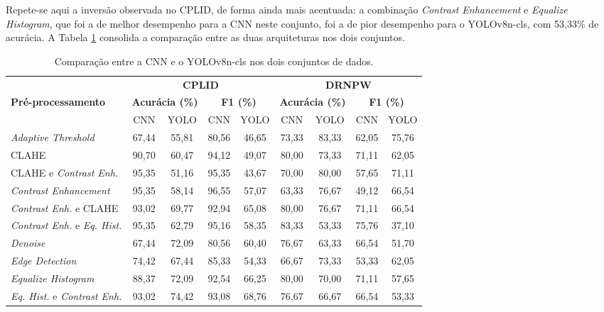 Repete-se aqui a inversão observada no CPLID, de forma ainda mais acentuada: a combinação \textit{Contrast Enhancement} e \textit{Equalize Histogram}, que foi a de melhor desempenho para a CNN neste conjunto, foi a de pior desempenho para o YOLOv8n-cls, com 53,33\% de acurácia. A Tabela \ref{tab:comparativo_arquiteturas} consolida a comparação entre as duas arquiteturas nos dois conjuntos.

\begin{table}[H]
    \centering
    \caption{\label{tab:comparativo_arquiteturas}Comparação entre a CNN e o YOLOv8n-cls nos dois conjuntos de dados.}
    \vspace{0.2cm}
    \footnotesize
    \setlength{\tabcolsep}{4pt}
    \begin{tabular}{lcccccccc}
        \hline
        & \multicolumn{4}{c}{\textbf{CPLID}} & \multicolumn{4}{c}{\textbf{DRNPW}} \\
        \textbf{Pré-processamento} & \multicolumn{2}{c}{\textbf{Acurácia (\%)}} & \multicolumn{2}{c}{\textbf{F1 (\%)}} & \multicolumn{2}{c}{\textbf{Acurácia (\%)}} & \multicolumn{2}{c}{\textbf{F1 (\%)}} \\
        & CNN & YOLO & CNN & YOLO & CNN & YOLO & CNN & YOLO \\
        \hline
        \textit{Adaptive Threshold} & 67,44 & 55,81 & 80,56 & 46,65 & 73,33 & 83,33 & 62,05 & 75,76 \\
        CLAHE & 90,70 & 60,47 & 94,12 & 49,07 & 80,00 & 73,33 & 71,11 & 62,05 \\
        CLAHE e \textit{Contrast Enh.} & 95,35 & 51,16 & 95,35 & 43,67 & 70,00 & 80,00 & 57,65 & 71,11 \\
        \textit{Contrast Enhancement} & 95,35 & 58,14 & 96,55 & 57,07 & 63,33 & 76,67 & 49,12 & 66,54 \\
        \textit{Contrast Enh.} e CLAHE & 93,02 & 69,77 & 92,94 & 65,08 & 80,00 & 76,67 & 71,11 & 66,54 \\
        \textit{Contrast Enh.} e \textit{Eq. Hist.} & 95,35 & 62,79 & 95,16 & 58,35 & 83,33 & 53,33 & 75,76 & 37,10 \\
        \textit{Denoise} & 67,44 & 72,09 & 80,56 & 60,40 & 76,67 & 63,33 & 66,54 & 51,70 \\
        \textit{Edge Detection} & 74,42 & 67,44 & 85,33 & 54,33 & 66,67 & 73,33 & 53,33 & 62,05 \\
        \textit{Equalize Histogram} & 88,37 & 72,09 & 92,54 & 66,25 & 80,00 & 70,00 & 71,11 & 57,65 \\
        \textit{Eq. Hist.} e \textit{Contrast Enh.} & 93,02 & 74,42 & 93,08 & 68,76 & 76,67 & 66,67 & 66,54 & 53,33 \\

\end{tabular}
\end{table}
